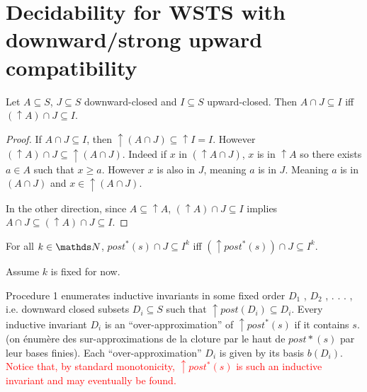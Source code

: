 
\section{Decidability for WSTS with downward/strong upward compatibility}



\begin{lemma}
Let $A \subseteq S$, $J \subseteq S$ downward-closed and $I \subseteq S$ upward-closed. 
Then $A \cap J \subseteq I$  iff $ (\uparrow  A) \cap J \subseteq I$.
\end{lemma}


\begin{proof}

If 
$A \cap J \subseteq I$,
then
${\uparrow (A \cap J)} \subseteq {\uparrow I} = I$.
However
$({\uparrow A}) \cap J \subseteq {\uparrow (A \cap J)}$.
Indeed if $x$ in $({\uparrow A} \cap J)$,
$x$ is in $\uparrow A$
so there exists $a \in A$ such that $x \geq a$.
However $x$ is also in $J$, meaning $a$ is in $J$.
Meaning $a$ is in $(A \cap J)$
and $x \in { \uparrow (A \cap J)}$.

In the other direction,
since $A \subseteq {\uparrow A}$,
$({\uparrow  A}) \cap J \subseteq I$ implies
$A \cap J \subseteq ({\uparrow  A}) \cap J \subseteq I$.
\end{proof}


\begin{corollary}
For all $k \in \N$,
$ post^*(s)\cap J \subseteq I^k $  iff $ (\uparrow  post^*(s)) \cap J \subseteq I^k$. 
\end{corollary}




Assume $k$ is fixed for now.

Procedure 1 enumerates inductive invariants in some fixed order $D_1$ , $D_2$ , . . . , i.e. downward closed subsets $D_i \subseteq S$ such that $\uparrow post(D_i ) \subseteq D_i$. 
Every inductive invariant $D_i$ is an “over-approximation” of $\uparrow post^*(s)$ if it contains $s$.
(on énumère des sur-approximations de la cloture par le haut de $post*(s)$ par leur bases finies).
Each “over-approximation” $D_i$ is given by its basis $b(D_i)$. \textcolor{red}{Notice that, by standard monotonicity, $\uparrow post^*(s)$ is such an inductive invariant and may
eventually be found.}

